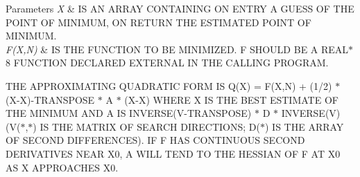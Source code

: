 \begin{DoxyParams}{Parameters}
\hline
{\em X} & IS AN A\+R\+R\+AY C\+O\+N\+T\+A\+I\+N\+I\+NG ON E\+N\+T\+RY A G\+U\+E\+SS OF T\+HE P\+O\+I\+NT OF M\+I\+N\+I\+M\+UM, ON R\+E\+T\+U\+RN T\+HE E\+S\+T\+I\+M\+A\+T\+ED P\+O\+I\+NT OF M\+I\+N\+I\+M\+UM. \\
\hline
{\em F(X,N)} & IS T\+HE F\+U\+N\+C\+T\+I\+ON TO BE M\+I\+N\+I\+M\+I\+Z\+ED. F S\+H\+O\+U\+LD BE A R\+E\+A\+L$\ast$8 F\+U\+N\+C\+T\+I\+ON D\+E\+C\+L\+A\+R\+ED E\+X\+T\+E\+R\+N\+AL IN T\+HE C\+A\+L\+L\+I\+NG P\+R\+O\+G\+R\+AM.\\
\hline
\end{DoxyParams}
T\+HE A\+P\+P\+R\+O\+X\+I\+M\+A\+T\+I\+NG Q\+U\+A\+D\+R\+A\+T\+IC F\+O\+RM IS Q(X\textquotesingle{}) = F(\+X,\+N) + (1/2) $\ast$ (X\textquotesingle{}-\/X)-\/\+T\+R\+A\+N\+S\+P\+O\+SE $\ast$ A $\ast$ (X\textquotesingle{}-\/X) W\+H\+E\+RE X IS T\+HE B\+E\+ST E\+S\+T\+I\+M\+A\+TE OF T\+HE M\+I\+N\+I\+M\+UM A\+ND A IS I\+N\+V\+E\+R\+SE(V-\/\+T\+R\+A\+N\+S\+P\+O\+SE) $\ast$ D $\ast$ I\+N\+V\+E\+R\+S\+E(\+V) (V($\ast$,$\ast$) IS T\+HE M\+A\+T\+R\+IX OF S\+E\+A\+R\+CH D\+I\+R\+E\+C\+T\+I\+O\+NS; D($\ast$) IS T\+HE A\+R\+R\+AY OF S\+E\+C\+O\+ND D\+I\+F\+F\+E\+R\+E\+N\+C\+ES). IF F H\+AS C\+O\+N\+T\+I\+N\+U\+O\+US S\+E\+C\+O\+ND D\+E\+R\+I\+V\+A\+T\+I\+V\+ES N\+E\+AR X0, A W\+I\+LL T\+E\+ND TO T\+HE H\+E\+S\+S\+I\+AN OF F AT X0 AS X A\+P\+P\+R\+O\+A\+C\+H\+ES X0.

